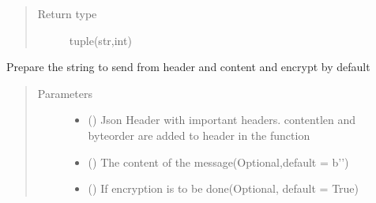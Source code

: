 \documentclass[letterpaper,10pt,english]{sphinxmanual}
\begin{document}
\begin{fulllineitems}
\begin{fulllineitems}
\begin{quote}
\begin{description}
\item[{Return type}] \leavevmode
tuple(str,int)

\end{description}\end{quote}

\end{fulllineitems}


\begin{fulllineitems}
\label{\detokenize{lb_msg:lb_msg.LoadBalancerMessage._prepareMessage}}
Prepare the string to send from header and content and encrypt by default
\begin{quote}\begin{description}
\item[{Parameters}] \leavevmode\begin{itemize}
\item {} 
 () \textendash{} Json Header with important headers. content\sphinxhyphen{}len and byteorder are added to header in the function

\item {} 
 () \textendash{} The content of the message(Optional,default = b’’)

\item {} 
 () \textendash{} If encryption is to be done(Optional, default = True)

\end{itemize}

\end{description}\end{quote}

\end{fulllineitems}



\end{fulllineitems}
\end{document}
